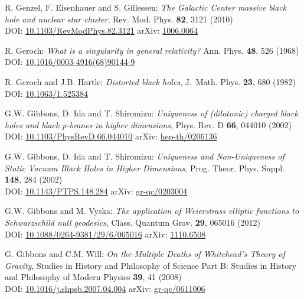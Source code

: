 \begin{thebibliography}{123}
R. Genzel, F. Eisenhauer and S. Gillessen:
{\em The Galactic Center massive black hole and nuclear star cluster},
Rev. Mod. Phys. {\bf 82}, 3121 (2010)\\
DOI: \href{https://doi.org/10.1103/RevModPhys.82.3121}{10.1103/RevModPhys.82.3121}\hfill
arXiv: \href{https://arxiv.org/abs/1006.0064}{1006.0064}

R. Geroch:
{\em What is a singularity in general relativity?}
Ann. Phys. {\bf 48}, 526 (1968)\\
DOI: \href{https://doi.org/10.1016/0003-4916(68)90144-9}{10.1016/0003-4916(68)90144-9}

R. Geroch and J.B. Hartle:
{\em Distorted black holes},
J.~Math. Phys. {\bf 23}, 680 (1982)\\
DOI: \href{https://doi.org/10.1063/1.525384}{10.1063/1.525384}

G.W. Gibbons, D. Ida and T. Shiromizu:
{\em Uniqueness of (dilatonic) charged black holes and black p-branes in higher dimensions},
Phys. Rev. D {\bf 66}, 044010 (2002)\\
DOI: \href{https://doi.org/10.1103/PhysRevD.66.044010}{10.1103/PhysRevD.66.044010}\hfill
arXiv: \href{https://arxiv.org/abs/hep-th/0206136}{hep-th/0206136}

G.W. Gibbons, D. Ida and T. Shiromizu:
{\em Uniqueness and Non-Uniqueness of Static Vacuum Black Holes in Higher Dimensions},
Prog. Theor. Phys. Suppl. {\bf 148}, 284 (2002)\\
DOI: \href{https://doi.org/10.1143/PTPS.148.284}{10.1143/PTPS.148.284}\hfill
arXiv: \href{https://arxiv.org/abs/gr-qc/0203004}{gr-qc/0203004}

G.W. Gibbons and M. Vyska:
{\em The application of Weierstrass elliptic functions to Schwarzschild null geodesics},
Class. Quantum Grav. {\bf 29}, 065016 (2012)\\
DOI: \href{https://doi.org/10.1088/0264-9381/29/6/065016}{10.1088/0264-9381/29/6/065016}\hfill
arXiv: \href{https://arxiv.org/abs/1110.6508}{1110.6508}

G. Gibbons and C.M. Will: {\em On the Multiple Deaths of Whitehead's Theory of Gravity},
Studies in History and Philosophy of Science Part B: Studies in History and Philosophy of Modern Physics {\bf 39}, 41 (2008)\\
DOI: \href{https://doi.org/10.1016/j.shpsb.2007.04.004}{10.1016/j.shpsb.2007.04.004}\hfill
arXiv: \href{https://arxiv.org/abs/gr-qc/0611006}{gr-qc/0611006}


\end{thebibliography}
